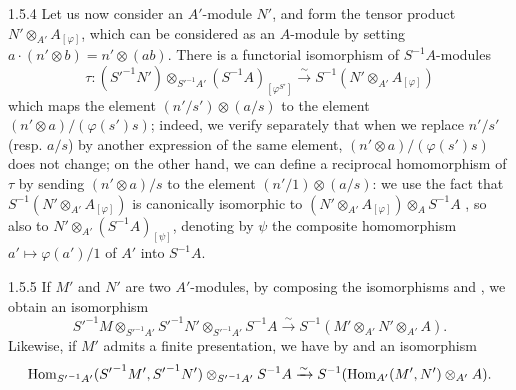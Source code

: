 \begin{env}{1.5.4}
\label{env-0.1.5.4}
Let us now consider an $A'$-module $N'$, and form the tensor product $N'\otimes_{A'}A_{[\varphi]}$,
which can be considered as an $A$-module by setting $a\cdot(n'\otimes b)=n'\otimes(ab)$. There is a
functorial isomorphism of $S^{-1}A$-modules
\[
  \tau\colon({S'}^{-1}N')\otimes_{{S'}^{-1}A'}(S^{-1}A)_{[\varphi^{S'}]}
  \xrightarrow{\sim}S^{-1}(N'\otimes_{A'}A_{[\varphi]})
\]
which maps the element $(n'/s')\otimes(a/s)$ to the element $(n'\otimes a)/(\varphi(s')s)$;
indeed, we verify separately that when we replace $n'/s'$ (resp. $a/s$) by another expression of the
same element, $(n'\otimes a)/(\varphi(s')s)$ does not change; on the other hand, we can define a
reciprocal homomorphism of $\tau$ by sending $(n'\otimes a)/s$ to the element $(n'/1)\otimes(a/s)$:
we use the fact that $S^{-1}(N'\otimes_{A'}A_{[\varphi]})$ is canonically isomorphic to
$(N'\otimes_{A'}A_{[\varphi]})\otimes_A S^{-1}A$ , so also to $N'\otimes_{A'}(S^{-1}A)_{[\psi]}$,
denoting by $\psi$ the composite homomorphism $a'\mapsto\varphi(a')/1$ of $A'$ into $S^{-1}A$.
\end{env}

\begin{env}{1.5.5}
\label{env-0.1.5.5}
If $M'$ and $N'$ are two $A'$-modules, by composing the isomorphisms  and , we obtain
an isomorphism
\[
  {S'}^{-1}M\otimes_{{S'}^{-1}A'}{S'}^{-1}N'\otimes_{{S'}^{-1}A'}S^{-1}A
  \xrightarrow{\sim}S^{-1}(M'\otimes_{A'}N'\otimes_{A'}A).
\]
Likewise, if $M'$ admits a finite presentation, we have by  and  an isomorphism
\[
  \operatorname{Hom}_{{S'}^{-1}A'}({S'}^{-1}M',{S'}^{-1}N')\otimes_{{S'}^{-1}A'}S^{-1}A
  \xrightarrow{\sim}S^{-1}(\operatorname{Hom}_{A'}(M',N')\otimes_{A'}A).
\]
\end{env}

